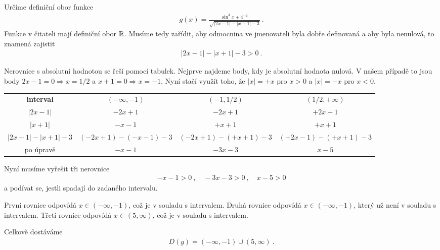 \begin{example}
    Určíme definiční obor funkce \begin{align*}
        g(x) = \frac{\sin^3 x + 4^{-x}}{\sqrt{|2x-1|-|x+1|-3}} \:.
    \end{align*}
    Funkce v čitateli mají definiční obor $\mathbb{R}$. Musíme tedy zařídit, aby odmocnina ve jmenovateli byla dobře definovaná a aby byla nenulová, to znamená zajistit \begin{align*}
        |2x-1|-|x+1|-3 > 0 \:.
    \end{align*}

    Nerovnice s absolutní hodnotou se řeší pomocí tabulek. Nejprve najdeme body, kdy je absolutní hodnota nulová. V našem případě to jsou body $2x-1 = 0 \Rightarrow x=1/2$ a $x+1=0 \Rightarrow x=-1$. Nyní stačí využít toho, že $|x| = +x$ pro $x>0$ a $|x| = -x$ pro $x<0$.

    \begin{table}[H]
        \centering
        \begin{tabular}{c||c|c|c}
            
            \textbf{interval} & $(-\infty,-1)$ & $(-1,1/2)$ & $(1/2, +\infty)$ \\
            \hhline{=#=|=|=} 
            $|2x-1|$ & $-2x+1$ & $-2x+1$ & $+2x-1$ \\
            \hline
            $|x+1|$ & $-x-1$ & $+x+1$ & $+x+1$ \\
            \hhline{=#=|=|=}
            $|2x-1|-|x+1|-3$ & $(-2x+1)-(-x-1)-3$ & $(-2x+1)-(+x+1)-3$ & $(+2x-1)-(+x+1)-3$ \\
            \hline
            po úpravě & $-x-1$ & $ -3x - 3$ & $x-5$
            
        \end{tabular}
    \end{table}
    Nyní musíme vyřešit tři nerovnice \begin{align*}
        -x-1>0 \:, \quad -3x -3 >0 \:, \quad x-5 > 0 
    \end{align*}
    a podívat se, jestli spadají do zadaného intervalu.

    První rovnice odpovídá $x \in (-\infty,-1)$, což je v souladu s intervalem.
    Druhá rovnice odpovídá $x \in (-\infty,-1)$, který už není v souladu s intervalem.
    Třetí rovnice odpovídá $x \in (5, \infty)$, což je v souladu s intervalem.

    Celkově dostáváme 
    \begin{align*}
        \boxed{ D(g) = (-\infty, -1) \cup (5, \infty) } \:.
    \end{align*}
\end{example}
